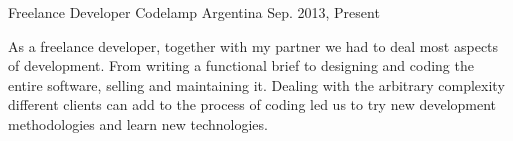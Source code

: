 \begin{cventries}
\cventry
{Freelance Developer} %
{Codelamp} %
{Argentina} %
{Sep. 2013, Present} %
{
\begin{cvitems}
As a freelance developer, together with my partner we had to deal most aspects of development. From writing a functional brief to designing and coding the entire software, selling and maintaining it.
Dealing with the arbitrary complexity different clients can add to the process of coding led us to try new development methodologies and learn new technologies.
\end{cvitems}
}


\end{cventries}
